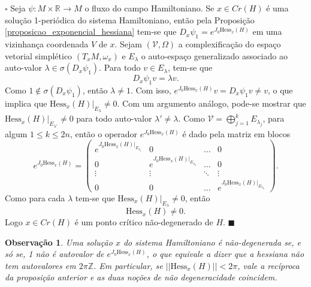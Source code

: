 \documentclass[12pt]{book}
\newtheorem{observacao}[teorema]{Observação}
\newenvironment{prova}[1]{$\square$ #1}{\hfill$\blacksquare$}
\newcommand{\autoespaco}[1]{E_{#1}}
\newcommand{\complexificado}[1]{\mathcal{#1}}
\newcommand{\espacotangenteponto}[2]{T_{#1}#2}
\newcommand{\espectrooperador}[1]{\sigma(#1)}
\newcommand{\estruturacomplexa}{J_{0}}
\newcommand{\hessianaponto}[2]{\text{Hess}_{#1}(#2)}
\newcommand{\inteiros}{\mathbb{Z}}
\newcommand{\norma}[1]{||#1||}
\newcommand{\pontoscriticos}[1]{\textit{Cr}(#1)}
\newcommand{\real}[1]{\mathbb{R}^{#1}}
\newcommand{\reta}{\real{}}
\begin{document}
	\begin{prova}
		Seja $\psi:M\times \reta\to M$ o fluxo do campo Hamiltoniano. Se $x\in \pontoscriticos{H}$ é uma solução 1-periódica do sistema Hamiltoniano, então pela Proposição \ref{proposicao_exponencial_hessiana} tem-se que $D_{x}\psi_{1}=e^{\estruturacomplexa \hessianaponto{x}{H}}$ em uma vizinhança coordenada $V$ de $x$. Sejam $(\complexificado{V}, \Omega)$ a complexificação do espaço vetorial simplético $(\espacotangenteponto{x}{M}, \omega_{x})$ e $E_{\lambda}$ o auto-espaço generalizado associado ao auto-valor $\lambda \in \espectrooperador{D_{x}\psi_{1}}$. Para todo $v\in \autoespaco{\lambda}$, tem-se que
		$$
		D_{x}\psi_{1}v=\lambda v.
		$$
		Como $1\notin \espectrooperador{D_{x}\psi_{1}}$, então $\lambda \neq 1$. Com isso, $e^{\estruturacomplexa \hessianaponto{x}{H}}v = D_{x}\psi_{1}v \neq v$, o que implica que
		$\hessianaponto{x}{H}|_{\autoespaco{\lambda}}\neq 0$. Com um argumento análogo, pode-se mostrar que $\hessianaponto{x}{H}|_{\autoespaco{\lambda'}} \neq 0$ para todo auto-valor $\lambda'\neq \lambda$. Como $\complexificado{V} = \bigoplus_{j=1}^{k} \autoespaco{\lambda_{j}}$, para algum $1\leq k\leq2n$, então o operador $e^{\estruturacomplexa \hessianaponto{x}{H} }$ é dado pela matriz em blocos
		$$
			e^{\estruturacomplexa \hessianaponto{x}{H}}=
			\left(
			\begin{array}{ccccc}
			e^{\estruturacomplexa \hessianaponto{x}{H}|_{\autoespaco{\lambda_{1} }} } & 0 &\dots & 0 
			\\
			0 & e^{\estruturacomplexa \hessianaponto{x}{H}|_{\autoespaco{\lambda_{2}}}} &\dots & 0 
			\\
			\vdots & \vdots & \ddots & \vdots 
			\\
			0 & 0 & \dots & e^{\estruturacomplexa \hessianaponto{x}{H}|_{\autoespaco{\lambda_{k}}}}
			\end{array}
			\right).
		$$
		Como para cada $\lambda$ tem-se que $\hessianaponto{x}{H}|_{\autoespaco{\lambda}}\neq 0$, então
		$$
		\hessianaponto{x}{H}\neq 0.
		$$
		Logo $x\in \pontoscriticos{H}$ é um ponto crítico não-degenerado de $H$.
	\end{prova}
	
	\begin{observacao}
		Uma solução $x$ do sistema Hamiltoniano é não-degenerada se, e só se, 1 não é autovalor de $e^{\estruturacomplexa \hessianaponto{x}{H}}$, o que equivale a dizer que a hessiana não tem autovalores em $2\pi \inteiros$. Em particular, se $\norma{\hessianaponto{x}{H}}<2\pi$, vale a recíproca da proposição anterior e as duas noções de não degeneracidade coincidem.
	\end{observacao}
	
\end{document}
